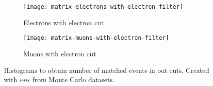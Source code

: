 \begin{figure}[h!]
    \centering
    \begin{subfigure}[c]{0.48\linewidth}
        \centering
        \texttt{[image: matrix-electrons-with-electron-filter]}
        \caption{%
            Electrons with electron cut
        }
        \label{fig:paw-pcharged/electrons}
    \end{subfigure}
    \hfill
    \begin{subfigure}[c]{0.48\linewidth}
        \centering
        \texttt{[image: matrix-muons-with-electron-filter]}
        \caption{%
            Muons with electron cut
        }
        \label{fig:paw-pcharged/muons}
    \end{subfigure}
    \caption{%
        Histograms to obtain number of matched events in out cuts. Created with
        \textsc{paw} from Monte Carlo datasets.
    }
    \label{fig:paw-matrix-electrons}
\end{figure}
